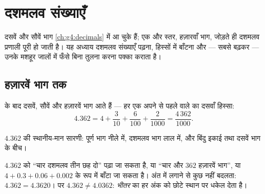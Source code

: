\chapter{दशमलव संख्याएँ}\label{ch:g5:decimals}

दसवें और सौवें भाग \cref{ch:g4:decimals} में आ चुके हैं; एक और
स्तर, हज़ारवाँ भाग, जोड़ते ही दशमलव प्रणाली पूरी हो जाती है। यह
अध्याय दशमलव संख्याएँ पढ़ना, हिस्सों में बाँटना और --- सबसे
बढ़कर --- उनके मशहूर जालों में फँसे बिना तुलना करना पक्का कराता है।

\section{हज़ारवें भाग तक}

\begin{definition}[दशमलव स्थान]\label{def:g5:decimals:places}
 के बाद दसवें, सौवें और हज़ारवें भाग आते हैं ---
हर एक अपने से पहले वाले का दसवाँ हिस्सा:
\[
4.362 = 4 + \frac{3}{10} + \frac{6}{100} + \frac{2}{1000}
= \frac{4\,362}{1000}.
\]
\end{definition}

\begin{omfigure}

{\small $4.362$ की स्थानीय-मान सारणी: पूर्ण भाग नीले में, दशमलव
भाग लाल में, और बिंदु इकाई तथा दसवें भाग के बीच।}
\end{omfigure}

\begin{example}[कई पाठ, एक ही संख्या]\label{ex:g5:decimals:readings}
$4.362$ को ``चार दशमलव तीन छह दो'' पढ़ा जा सकता है, या ``चार और
$362$ हज़ारवें भाग'', या $4 + 0.3 + 0.06 + 0.002$ के रूप में
बाँटा जा सकता है। अंत में  लगाने से कुछ नहीं बदलता:
$4.362 = 4.3620$। पर $4.362 \neq 4.0362$: \emph{भीतर} का 
हर अंक को छोटे स्थान पर धकेल देता है।
\end{example}

